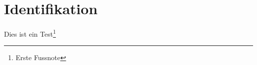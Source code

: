 
\chapter{Identifikation}
\label{chap:identifikation}

Dies ist ein Test\footnote{Erste Fussnote}






























